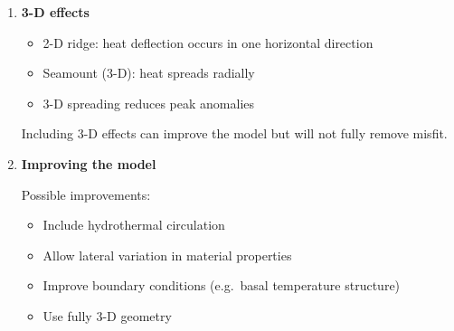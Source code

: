 \documentclass[final,a4paper,12pt]{article}
\begin{document}
\begin{enumerate}
\item \textbf{3-D effects}

\begin{itemize}
\item 2-D ridge: heat deflection occurs in one horizontal direction
\item Seamount (3-D): heat spreads radially
\item 3-D spreading reduces peak anomalies
\end{itemize}

Including 3-D effects can improve the model but will not fully remove misfit.

\item \textbf{Improving the model}

Possible improvements:

\begin{itemize}
\item Include hydrothermal circulation
\item Allow lateral variation in material properties
\item Improve boundary conditions (e.g.\ basal temperature structure)
\item Use fully 3-D geometry
\end{itemize}

\end{enumerate}
\end{document}
